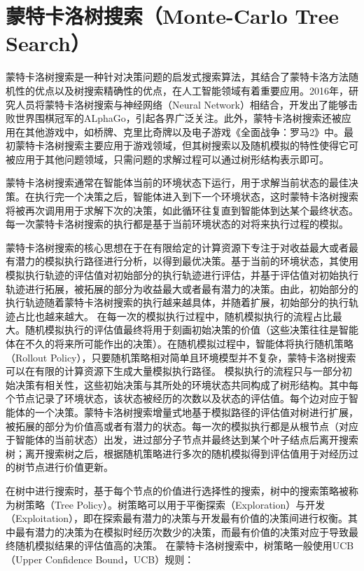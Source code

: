 \section{蒙特卡洛树搜索（Monte-Carlo Tree Search）}
蒙特卡洛树搜索是一种针对决策问题的启发式搜索算法\cite{DBLP:conf/aiide/ChaslotBSS08,chaslot2006monte,DBLP:conf/ecml/KocsisS06}，其结合了蒙特卡洛方法随机性的优点以及树搜索精确性的优点，在人工智能领域有着重要应用。2016年，研究人员将蒙特卡洛树搜索与神经网络（Neural Network）相结合，开发出了能够击败世界围棋冠军的ALphaGo\cite{DBLP:journals/nature/SilverHMGSDSAPL16}，引起各界广泛关注。此外，蒙特卡洛树搜索还被应用在其他游戏中，如桥牌、克里比奇牌以及电子游戏《全面战争：罗马2》中。最初蒙特卡洛树搜索主要应用于游戏领域，但其树搜索以及随机模拟的特性使得它可被应用于其他问题领域，只需问题的求解过程可以通过树形结构表示即可。

蒙特卡洛树搜索通常在智能体当前的环境状态下运行，用于求解当前状态的最佳决策。在执行完一个决策之后，智能体进入到下一个环境状态，这时蒙特卡洛树搜索将被再次调用用于求解下次的决策，如此循环往复直到智能体到达某个最终状态。每一次蒙特卡洛树搜索的执行都是基于当前环境状态的对将来执行过程的模拟。

蒙特卡洛树搜索的核心思想在于在有限给定的计算资源下专注于对收益最大或者最有潜力的模拟执行路径进行分析，以得到最优决策。基于当前的环境状态，其使用模拟执行轨迹的评估值对初始部分的执行轨迹进行评估，并基于评估值对初始执行轨迹进行拓展，被拓展的部分为收益最大或者最有潜力的决策。由此，初始部分的执行轨迹随着蒙特卡洛树搜索的执行越来越具体，并随着扩展，初始部分的执行轨迹占比也越来越大。
在每一次的模拟执行过程中，随机模拟执行的流程占比最大。随机模拟执行的评估值最终将用于刻画初始决策的价值（这些决策往往是智能体在不久的将来所可能作出的决策）。在随机模拟过程中，智能体将执行随机策略（Rollout Policy），只要随机策略相对简单且环境模型并不复杂，蒙特卡洛树搜索可以在有限的计算资源下生成大量模拟执行路径。
模拟执行的流程只与一部分初始决策有相关性，这些初始决策与其所处的环境状态共同构成了树形结构。其中每个节点记录了环境状态，该状态被经历的次数以及状态的评估值。每个边对应于智能体的一个决策。蒙特卡洛树搜索增量式地基于模拟路径的评估值对树进行扩展，被拓展的部分为价值高或者有潜力的状态。每一次的模拟执行都是从根节点（对应于智能体的当前状态）出发，进过部分子节点并最终达到某个叶子结点后离开搜索树；离开搜索树之后，根据随机策略进行多次的随机模拟得到评估值用于对经历过的树节点进行价值更新。

%
在树中进行搜索时，基于每个节点的价值进行选择性的搜索，树中的搜索策略被称为树策略（Tree Policy）。树策略可以用于平衡探索（Exploration）与开发（Exploitation），即在探索最有潜力的决策与开发最有价值的决策间进行权衡。其中最有潜力的决策为在模拟时经历次数少的决策，而最有价值的决策对应于导致最终随机模拟结果的评估值高的决策。
在蒙特卡洛树搜索中，树策略一般使用UCB（Upper Confidence Bound，UCB）\cite{DBLP:journals/ml/AuerCF02}规则：

